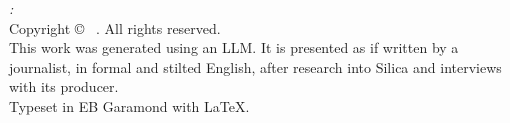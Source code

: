 \thispagestyle{empty}
\vspace*{\fill}
\begin{flushleft}\footnotesize
\textit{\booktitle: \booksubtitle}\\[0.5\onelineskip]
Copyright \copyright\ {\liningfigures\bookyear} \bookauthor. All rights reserved.\\[0.5\onelineskip]
This work was generated using an LLM. It is presented as if written by a
journalist, in formal and stilted English, after research into Silica
and interviews with its producer.\\[0.5\onelineskip]
Typeset in EB Garamond with \LaTeX.
\end{flushleft}
\clearpage
